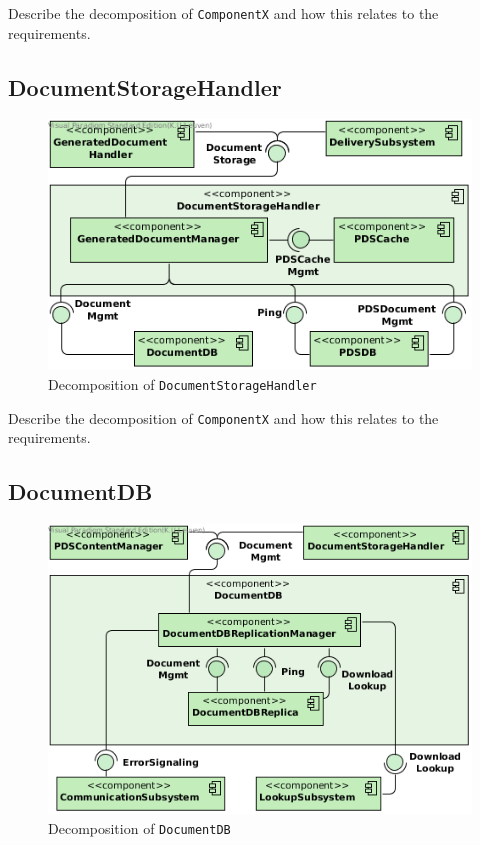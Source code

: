 Describe the decomposition of \texttt{ComponentX} and how this relates to the
requirements.

\subsection{DocumentStorageHandler}
\begin{figure}[!htp]
    \centering
    \includegraphics[width=\textwidth]{figures/DocumentStorageHandler.png}
    \caption{Decomposition of \texttt{DocumentStorageHandler}}\label{fig:decomp-docstohan}
\end{figure}

Describe the decomposition of \texttt{ComponentX} and how this relates to the
requirements.

\subsection{DocumentDB}
\begin{figure}[!htp]
    \centering
    \includegraphics[width=\textwidth]{figures/DocumentDB.png}
    \caption{Decomposition of \texttt{DocumentDB}}\label{fig:decomp-docdb}
\end{figure}

